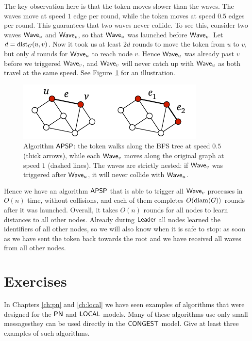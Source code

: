 The key observation here is that the token moves slower than the waves. The waves move at speed $1$ edge per round, while the token moves at speed $0.5$ edges per round. This guarantees that two waves never collide. To see this, consider two waves $\textup{\sffamily Wave}_u$ and $\textup{\sffamily Wave}_v$, so that $\textup{\sffamily Wave}_u$ was launched before $\textup{\sffamily Wave}_v$. Let $d = \operatorname{dist}_G(u,v)$. Now it took us at least $2d$ rounds to move the token from $u$ to $v$, but only $d$ rounds for $\textup{\sffamily Wave}_u$ to reach node $v$. Hence $\textup{\sffamily Wave}_u$ was already past $v$ before we triggered $\textup{\sffamily Wave}_v$, and $\textup{\sffamily Wave}_v$ will never catch up with $\textup{\sffamily Wave}_u$ as both travel at the same speed. See Figure~\ref{fig:pipeline} for an illustration.

\begin{figure}
    \centering
    \includegraphics[page=\PPipeline]{figs.pdf}
    \caption{Algorithm $\textup{\sffamily APSP}$: the token walks along the BFS tree at speed $0.5$ (thick arrows), while each $\textup{\sffamily Wave}_v$ moves along the original graph at speed $1$ (dashed lines). The waves are strictly nested: if $\textup{\sffamily Wave}_v$ was triggered after $\textup{\sffamily Wave}_u$, it will never collide with $\textup{\sffamily Wave}_u$.}\label{fig:pipeline}
\end{figure}

Hence we have an algorithm $\textup{\sffamily APSP}$ that is able to trigger all $\textup{\sffamily Wave}_v$ processes in $O(n)$ time, without collisions, and each of them completes $O(\operatorname{diam}(G))$ rounds after it was launched. Overall, it takes $O(n)$ rounds for all nodes to learn distances to all other nodes. Already during $\textup{\sffamily Leader}$ all nodes learned the identifiers of all other nodes, so we will also know when it is safe to stop: as soon as we have sent the token back towards the root and we have received all waves from all other nodes.


\section{Exercises}

\begin{ex}\label{ex:congest-prior}
    In Chapters \ref{ch:pn} and \ref{ch:local} we have seen examples of algorithms that were designed for the $\textup{\sffamily PN}$ and $\textup{\sffamily LOCAL}$ models. Many of these algorithms use only small messages\mydash they can be used directly in the $\textup{\sffamily CONGEST}$ model. Give at least three examples of such algorithms.
\end{ex}

